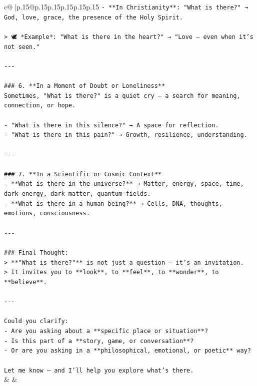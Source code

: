 \documentclass{article}
\begin{document}
{\begin{supertabular}{c@{$\;$}|p{.15\linewidth}@{}p{.15\linewidth}p{.15\linewidth}p{.15\linewidth}p{.15\linewidth}p{.15\linewidth}}
{{{\texttt{{-} **In Christianity**: "What is there?" → God, love, grace, the presence of the Holy Spirit.} \\
\\ 
\texttt{> 🕊️ *Example*: "What is there in the heart?" → "Love — even when it’s not seen."} \\
\\ 
\texttt{{-}{-}{-}} \\
\\ 
\texttt{\#\#\# 6. **In a Moment of Doubt or Loneliness**} \\
\texttt{Sometimes, "What is there?" is a quiet cry — a search for meaning, connection, or hope.} \\
\\ 
\texttt{{-} "What is there in this silence?" → A space for reflection.} \\
\texttt{{-} "What is there in this pain?" → Growth, resilience, understanding.} \\
\\ 
\texttt{{-}{-}{-}} \\
\\ 
\texttt{\#\#\# 7. **In a Scientific or Cosmic Context**} \\
\texttt{{-} **What is there in the universe?** → Matter, energy, space, time, dark energy, dark matter, quantum fields.} \\
\texttt{{-} **What is there in a human being?** → Cells, DNA, thoughts, emotions, consciousness.} \\
\\ 
\texttt{{-}{-}{-}} \\
\\ 
\texttt{\#\#\# Final Thought:} \\
\texttt{> **"What is there?"** is not just a question — it’s an invitation.  } \\
\texttt{> It invites you to **look**, to **feel**, to **wonder**, to **believe**.} \\
\\ 
\texttt{{-}{-}{-}} \\
\\ 
\texttt{Could you clarify:} \\
\texttt{{-} Are you asking about a **specific place or situation**?} \\
\texttt{{-} Is this part of a **story, game, or conversation**?} \\
\texttt{{-} Or are you asking in a **philosophical, emotional, or poetic** way?} \\
\\ 
\texttt{Let me know — and I’ll help you explore what’s there.} \\
            }
        }
    }
    & & \\ \\


\end{supertabular}}
\end{document}
